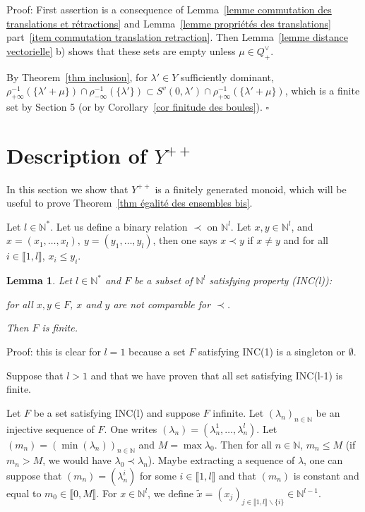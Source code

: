 \documentclass[12pt]{article}
\theoremstyle{plain}
\newtheorem{lemme}[thm]{Lemma}
\theoremstyle{definition}
\newcommand{\N}{\mathbb{N}}
\newcommand{\Ne}{\mathbb{N}^*}
\begin{document}
Proof: First assertion is a consequence of Lemma~\ref{lemme commutation des translations et rétractions} and Lemma~\ref{lemme propriétés des translations} part~\ref{item commutation translation retraction}. Then Lemma~\ref{lemme distance vectorielle} b) shows that these sets are empty unless $\mu\in Q^\vee_+$. 

By Theorem~\ref{thm inclusion}, for $\lambda'\in Y$ sufficiently dominant, $\rho_{+\infty}^{-1}(\{\lambda'+\mu\})\cap\rho_{-\infty}^{-1}(\{\lambda'\})\subset S^v(0,\lambda')\cap \rho_{+\infty}^{-1}(\{\lambda'+\mu\})$, which is a finite set by \cite{gaussent2014spherical} Section 5 (or by Corollary~\ref{cor finitude des boules}). $\square$








\section{Description of $Y^{++}$}\label{sect Y^++}

In this section we show that $Y^{++}$ is a finitely generated monoid, which will be useful to prove Theorem~\ref{thm égalité des ensembles bis}.



Let $l\in \Ne$. Let us define a binary relation $\prec$ on $\N^l$. Let $x,y\in \N^l$,  and $x=(x_1,\ldots,x_l),\ y=(y_1,\ldots,y_l)$, then one says $x\prec y$ if $x\neq y$ 
and for all $i\in \llbracket 1,l\rrbracket$, $x_i\leq y_i$.
\begin{lemme}\label{lemme ensembles d'incomparables}
Let $l\in \Ne$ and $F$ be a subset of $\N^l$ satisfying property (INC(l)): 

for all $x,y\in F$, $x$ and $y$ are not comparable for $\prec$. 

 Then $F$ is finite.
\end{lemme}

Proof: this  is clear for $l=1$ because a set $F$ satisfying INC(1) is a singleton or $\emptyset$. 

Suppose that $l>1$ and that we have proven that all set satisfying INC(l-1) is finite.

Let $F$ be a set  satisfying INC(l) and suppose $F$ infinite. Let $(\lambda_n)_{n\in \N}$ be an injective sequence of $F$. One writes $(\lambda_n)=(\lambda_n^1,\ldots,\lambda_n^l)$. Let $(m_n)=(\min(\lambda_n))_{n\in \N}$ and $M=\max \lambda_{0}$. Then for all $n\in \N$, $m_n\leq M$ (if $m_n>M$, we would have $\lambda_{0}\prec \lambda_n$). Maybe extracting a sequence of $\lambda$, one can suppose that $(m_n)=(\lambda_n^i)$ for some $i\in \llbracket 1, l\rrbracket$ and that $(m_n)$ is constant and equal to $m_0\in \llbracket 0,M\rrbracket$. For $x\in \N^l$, we define $\tilde{x}=(x_j)_{j\in \llbracket 1,l\rrbracket\backslash \{i\}}\in \N^{l-1}$. 
 
\end{document}
